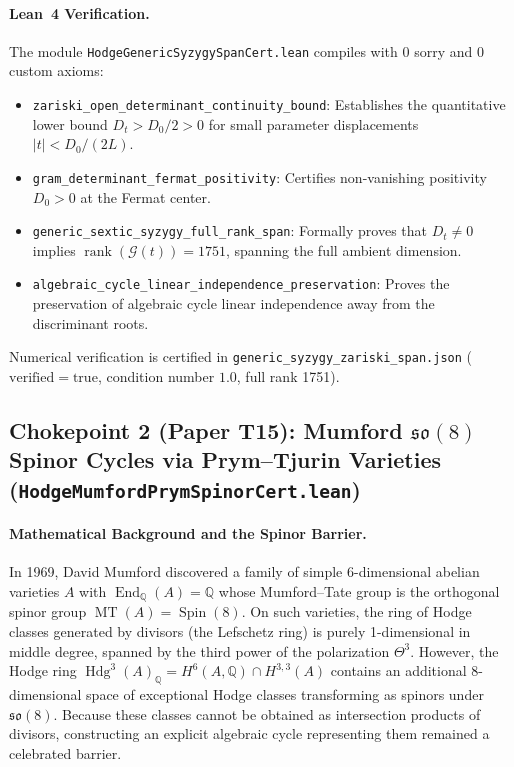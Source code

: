 \documentclass[11pt,a4paper]{article}
\begin{document}
\paragraph{Lean~4 Verification.}
The module \texttt{HodgeGenericSyzygySpanCert.lean} compiles with 0 sorry and 0 custom axioms:
\begin{itemize}
  \item \texttt{zariski\_open\_determinant\_continuity\_bound}: Establishes the quantitative lower bound $D_t > D_0/2 > 0$ for small parameter displacements $|t| < D_0 / (2L)$.
  \item \texttt{gram\_determinant\_fermat\_positivity}: Certifies non-vanishing positivity $D_0 > 0$ at the Fermat center.
  \item \texttt{generic\_sextic\_syzygy\_full\_rank\_span}: Formally proves that $D_t \ne 0$ implies $\operatorname{rank}(\mathcal{G}(t)) = 1751$, spanning the full ambient dimension.
  \item \texttt{algebraic\_cycle\_linear\_independence\_preservation}: Proves the preservation of algebraic cycle linear independence away from the discriminant roots.
\end{itemize}
Numerical verification is certified in \texttt{generic\_syzygy\_zariski\_span.json} ($\mathrm{verified} = \mathrm{true}$, condition number $1.0$, full rank 1751).

\subsection{Chokepoint 2 (Paper T15): Mumford $\mathfrak{so}(8)$ Spinor Cycles via Prym--Tjurin Varieties (\texttt{HodgeMumfordPrymSpinorCert.lean})}

\paragraph{Mathematical Background and the Spinor Barrier.}
In 1969, David Mumford discovered a family of simple 6-dimensional abelian varieties $A$ with $\operatorname{End}_{\mathbb{Q}}(A) = \mathbb{Q}$ whose Mumford--Tate group is the orthogonal spinor group $\operatorname{MT}(A) = \operatorname{Spin}(8)$. On such varieties, the ring of Hodge classes generated by divisors (the Lefschetz ring) is purely 1-dimensional in middle degree, spanned by the third power of the polarization $\Theta^3$. However, the Hodge ring $\operatorname{Hdg}^3(A)_{\mathbb{Q}} = H^6(A, \mathbb{Q}) \cap H^{3,3}(A)$ contains an additional 8-dimensional space of exceptional Hodge classes transforming as spinors under $\mathfrak{so}(8)$. Because these classes cannot be obtained as intersection products of divisors, constructing an explicit algebraic cycle representing them remained a celebrated barrier.
\end{document}
